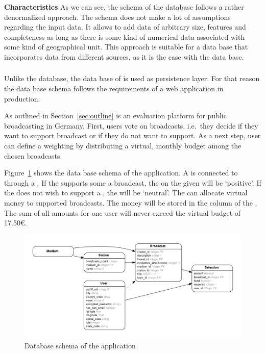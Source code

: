 \textbf{Characteristics}
As we can see, the schema of the \riso{} database follows a rather denormalized approach.
The schema does not make a lot of assumptions regarding the input data.
It allows to add data of arbitrary size, features and completeness as long as there is some kind of numerical data associated with some kind of geographical unit.
This approach is suitable for a data base that incorporates data from different sources, as it is the case with the \riso{} data base.


\subsubsection{\rufu{}}
Unlike the \riso{} database, the data base of \rufu{} is used as persistence layer.
For that reason the data base schema follows the requirements of a web application in production.

As outlined in Section~\ref{sec:outline} \rufu{} is an evaluation platform for public broadcasting in Germany.
First, users vote on broadcasts, i.e.\ they decide if they want to support broadcast or if they do not want to support.
As a next step, user can define a weighting by distributing a virtual, monthly budget among the chosen broadcasts.

Figure~\ref{fig:data:rundfunk} shows the data base schema of the application.
A  is connected to  through a .
If the  supports some a broadcast, the  on the given  will be `positive'.
If the  does not wish to support a , the  will be `neutral'.
The  can allocate virtual money to supported broadcasts.
The money will be stored in the column  of the .
The sum of all amounts for one user will never exceed the virtual budget of 17.50€.

\begin{figure}[h]
  \centering
  \includegraphics[width=\textwidth]{images/er}
  \caption{Database schema of the \rufu{} application}\label{fig:data:rundfunk}
\end{figure}

